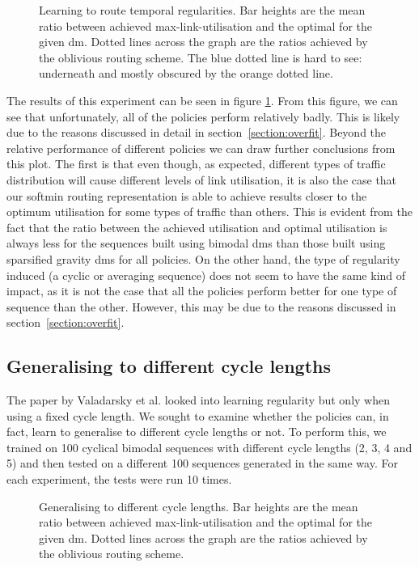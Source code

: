 \begin{figure}
    \centering
    
    \caption{Learning to route temporal regularities. Bar heights are the mean ratio between achieved max-link-utilisation and the optimal for the given \ac{dm}. Dotted lines across the graph are the ratios achieved by the oblivious routing scheme. The blue dotted line is hard to see: underneath and mostly obscured by the orange dotted line.}
    \label{fig:exp_cyclic}
\end{figure}

The results of this experiment can be seen in figure \ref{fig:exp_cyclic}. From this figure, we can see that unfortunately, all of the policies perform relatively badly. This is likely due to the reasons discussed in detail in section~\ref{section:overfit}. Beyond the relative performance of different policies we can draw further conclusions from this plot. The first is that even though, as expected, different types of traffic distribution will cause different levels of link utilisation, it is also the case that our softmin routing representation is able to achieve results closer to the optimum utilisation for some types of traffic than others. This is evident from the fact that the ratio between the achieved utilisation and optimal utilisation is always less for the sequences built using bimodal \acp{dm} than those built using sparsified gravity \acp{dm} for all policies. On the other hand, the type of regularity induced (a cyclic or averaging sequence) does not seem to have the same kind of impact, as it is not the case that all the policies perform better for one type of sequence than the other. However, this may be due to the reasons discussed in section~\ref{section:overfit}.

\subsection{Generalising to different cycle lengths}
The paper by Valadarsky et al. looked into learning regularity but only when using a fixed cycle length. We sought to examine whether the policies can, in fact, learn to generalise to different cycle lengths or not. To perform this, we trained on 100 cyclical bimodal sequences with different cycle lengths (2, 3, 4 and 5) and then tested on a different 100 sequences generated in the same way. For each experiment, the tests were run 10 times.

\begin{figure}
    \centering
    
    \caption{Generalising to different cycle lengths. Bar heights are the mean ratio between achieved max-link-utilisation and the optimal for the given \ac{dm}. Dotted lines across the graph are the ratios achieved by the oblivious routing scheme.}
    \label{fig:exp_vary}
\end{figure}

